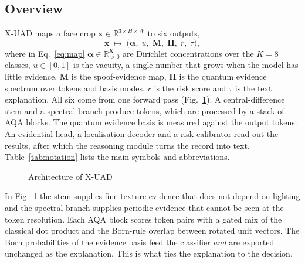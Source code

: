 \documentclass[conference]{IEEEtran}
\newcommand{\bs}[1]{\boldsymbol{#1}}
\newcommand{\R}{\mathbb{R}}
\newcommand{\sub}[1]{\subsection{\texorpdfstring{\textbf{#1}}{#1}}}
\begin{document}
\sub{Overview}
X-UAD maps a face crop $\bs{x}\in\R^{3\times H\times W}$ to six outputs,
\begin{equation}
\bs{x}\;\longmapsto\;\bigl(\bs{\alpha},\;u,\;\bs{M},\;\bs{\Pi},\;r,\;\tau\bigr),
\label{eq:map}
\end{equation}
where in Eq.~\eqref{eq:map} $\bs{\alpha}\in\R^{K}_{>0}$ are Dirichlet concentrations over
the $K=8$ classes, $u\in[0,1]$ is the vacuity, a single number that grows when the
model has little evidence, $\bs{M}$ is the spoof-evidence map, $\bs{\Pi}$ is the
quantum evidence spectrum over tokens and basis modes, $r$ is the risk score and
$\tau$ is the text explanation. All six come from one forward pass
(Fig.~\ref{fig:arch}). A central-difference stem and a spectral branch produce tokens,
which are processed by a stack of AQA blocks. The quantum evidence basis is measured
against the output tokens. An evidential head, a localisation decoder and a risk
calibrator read out the results, after which the reasoning module turns the record
into text. Table~\ref{tab:notation} lists the main symbols and abbreviations.

\begin{figure}
\centering
\resizebox{\textwidth}{!}{}
\caption{Architecture of X-UAD}
\label{fig:arch}
\end{figure}

In Fig.~\ref{fig:arch} the stem supplies fine texture evidence that does not depend on
lighting and the spectral branch supplies periodic evidence that cannot be seen at the
token resolution. Each AQA block scores token pairs with a gated mix of the classical
dot product and the Born-rule overlap between rotated unit vectors. The Born
probabilities of the evidence basis feed the classifier \emph{and} are exported
unchanged as the explanation. This is what ties the explanation to the decision.
\end{document}
